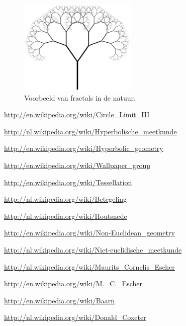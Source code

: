 \documentclass{article}
\begin{document}
\begin{itemize}
{\begin{figure}[Hh]
	\centering
	\includegraphics[width=0.5\textwidth]{fractal-tree}
	\caption{Voorbeeld van fractals in de natuur.}
\end{figure}

}

\end{itemize}

\pagebreak

\begin{thebibliography}{9}

\bibitem{}
	\url{http://en.wikipedia.org/wiki/Circle_Limit_III}

\bibitem{}
	\url{http://nl.wikipedia.org/wiki/Hyperbolische_meetkunde}

\bibitem{}
	\url{http://en.wikipedia.org/wiki/Hyperbolic_geometry}

\bibitem{}
	\url{http://en.wikipedia.org/wiki/Wallpaper_group}

\bibitem{}
	\url{http://en.wikipedia.org/wiki/Tessellation}

\bibitem{}
	\url{http://nl.wikipedia.org/wiki/Betegeling}

\bibitem{}
	\url{http://nl.wikipedia.org/wiki/Houtsnede}

\bibitem{}
	\url{http://en.wikipedia.org/wiki/Non-Euclidean_geometry}

\bibitem{}
	\url{http://nl.wikipedia.org/wiki/Niet-euclidische_meetkunde}

\bibitem{}
	\url{http://nl.wikipedia.org/wiki/Maurits_Cornelis_Escher}

\bibitem{}
	\url{http://en.wikipedia.org/wiki/M._C._Escher}

\bibitem{}
	\url{http://en.wikipedia.org/wiki/Baarn}

\bibitem{}
	\url{http://nl.wikipedia.org/wiki/Donald_Coxeter}

	
\end{thebibliography}
\end{document}
